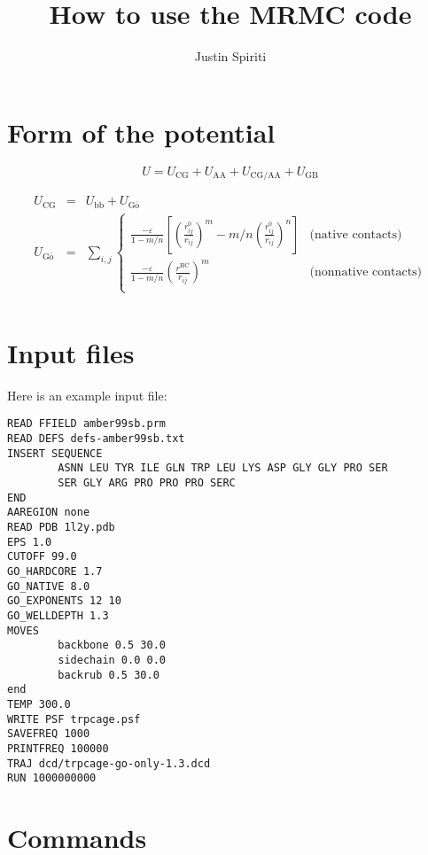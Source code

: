 \documentclass{article}      %
\title{How to use the MRMC code}  %
\author{Justin Spiriti}      %
\begin{document}

\maketitle                   %

\section{Form of the potential}

\begin{equation}
U = U_\mathrm{CG} + U_\mathrm{AA} + U_\mathrm{CG/AA} + U_\mathrm{GB}
\end{equation}

\begin{eqnarray}
U_\mathrm{CG} &=& U_\mathrm{bb} + U_\mathrm{G\overline{o}} \\
U_\mathrm{G\overline{o}} &=& \sum_{i,j} \left\{ 
\begin{array}{ll}
\frac{-\varepsilon}{1-m/n} \left[\left(\frac{r^0_{ij}}{r_{ij}}\right)^{m}-m/n\left(\frac{r^0_{ij}}{r_{ij}}\right)^{n}\right] & \textrm{(native contacts)} \\
\frac{-\varepsilon}{1-m/n} \left(\frac{r^\mathrm{HC}}{r_{ij}}\right)^{m}& \textrm{(nonnative contacts)} \\
\end{array}
\right. \\ 
\end{eqnarray}

\section{Input files}
Here is an example input file:
\begin{verbatim}
READ FFIELD amber99sb.prm
READ DEFS defs-amber99sb.txt
INSERT SEQUENCE
        ASNN LEU TYR ILE GLN TRP LEU LYS ASP GLY GLY PRO SER
        SER GLY ARG PRO PRO PRO SERC
END
AAREGION none
READ PDB 1l2y.pdb
EPS 1.0
CUTOFF 99.0
GO_HARDCORE 1.7
GO_NATIVE 8.0
GO_EXPONENTS 12 10
GO_WELLDEPTH 1.3
MOVES
        backbone 0.5 30.0
        sidechain 0.0 0.0
        backrub 0.5 30.0
end
TEMP 300.0
WRITE PSF trpcage.psf
SAVEFREQ 1000
PRINTFREQ 100000
TRAJ dcd/trpcage-go-only-1.3.dcd
RUN 1000000000
\end{verbatim}

\section{Commands}
\end{document}
